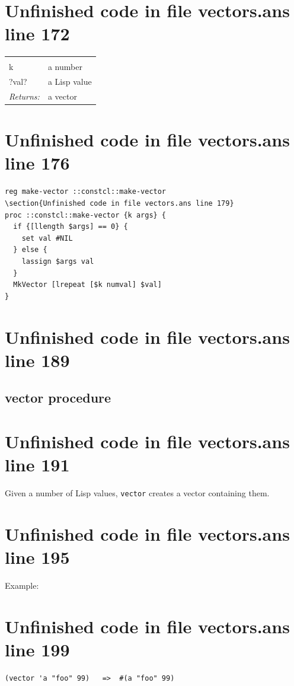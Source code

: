 \documentclass[twoside,9pt]{report}
\begin{document}
\section{Unfinished code in file vectors.ans line 172}
\noindent\begin{tabular}{ |p{1.9cm} p{8cm}| }
\hline
\rowcolor[HTML]{CCCCCC} \multicolumn{2}{|l|}{\bf make-vector? (public)} \\
k & a number \\
?val? & a Lisp value \\
\textit{Returns:} & a vector \\
\hline
\end{tabular}
\section{Unfinished code in file vectors.ans line 176}
\begin{lstlisting}
reg make-vector ::constcl::make-vector
\section{Unfinished code in file vectors.ans line 179}
proc ::constcl::make-vector {k args} {
  if {[llength $args] == 0} {
    set val #NIL
  } else {
    lassign $args val
  }
  MkVector [lrepeat [$k numval] $val]
}
\end{lstlisting}
\section{Unfinished code in file vectors.ans line 189}
\subsection{vector procedure}
\label{vector-procedure}
\section{Unfinished code in file vectors.ans line 191}


Given a number of Lisp values, \texttt{vector} creates a vector containing them.

\section{Unfinished code in file vectors.ans line 195}


Example:

\section{Unfinished code in file vectors.ans line 199}
\begin{verbatim}
(vector 'a "foo" 99)   =>  #(a "foo" 99)
\end{verbatim}
\end{document}
